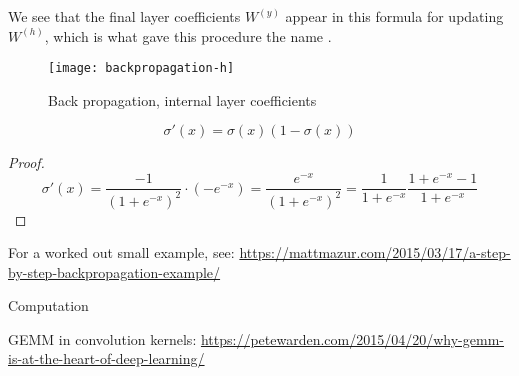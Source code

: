 We see that the final layer coefficients $W^{(y)}$ appear in this
formula for updating~$W^{(h)}$, which
is what gave this procedure the name .

\begin{figure}[ht]
  \texttt{[image: backpropagation-h]}
  \caption{Back propagation, internal layer coefficients}
  \label{fig:backprop-h}
\end{figure}


\begin{lemma}
  \label{lemma:sigma-prime}
  \[ \sigma'(x) = \sigma(x)(1-\sigma(x)) \]
\end{lemma}
\begin{proof}
  \[
  \sigma'(x)=\frac{-1}{ (1+e^{-x})^2 }\cdot (-e^{-x})
  = \frac{e^{-x}}{ (1+e^{-x})^2 }
  = \frac{1}{ 1+e^{-x} } \frac{1+e^{-x}-1}{ 1+e^{-x} }
  \]
\end{proof}

For a worked out small example, see: \url{https://mattmazur.com/2015/03/17/a-step-by-step-backpropagation-example/}

 {Computation}

GEMM in convolution kernels:
\url{https://petewarden.com/2015/04/20/why-gemm-is-at-the-heart-of-deep-learning/}
